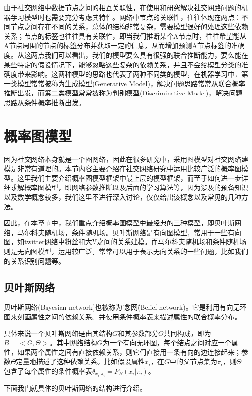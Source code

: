 由于社交网络中数据节点之间的相互关联性，在使用和研究解决社交网路问题的机器学习模型时也需要充分考虑其特性。网络中节点的关联性，往往体现在两点：不同节点之间存在不同的关系，总体的结构非常复杂，需要模型很好的处理这些依赖关系；节点的标签也往往具有关联性，即当我们推断某个A节点时，往往希望能从A节点周围的节点的标签分布并获取一定的信息，从而增加预测A节点标签的准确度。从这两点我们可以看出，我们的模型要么具有很强的联合推断能力，要么能在某些特定的假设情况下，能够忽略这些复杂的依赖关系，并且不会给模型分类的准确度带来影响。这两种模型的思路也代表了两种不同类的模型，在机器学习中，第一类模型常常被称为生成模型(Generative Model)，解决问题思路常常从联合概率推断出发，而第二类模型常常被称为判别模型(Discriminative Model)，解决问题思路从条件概率推断出发。

\section{概率图模型}

因为社交网络本身就是一个图网络，因此在很多研究中，采用图模型对社交网络建模是非常有道理的。本节内容主要介绍在社交网络研究中运用比较广泛的概率图模型。这里我们主要介绍概率图模型框架中最上层的模型框架，而至于如何进一步详细求解概率图模型，即网络参数推断以及后面的学习算法等，因为涉及的预备知识以及数学概念较多，我们这里不进行深入讨论，仅仅给出该概念以及常见的几种方法。

因此，在本章节中，我们重点介绍概率图模型中最经典的三种模型，即贝叶斯网络，马尔科夫随机场，条件随机场。贝叶斯网络是有向图模型，常用于一些有向图，如twitter网络中粉丝和大V之间的关系建模。而马尔科夫随机场和条件随机场则是无向图模型，运用较广泛，常常可以用于表示无向关系的一些问题，比如我们的关系识别问题等。


\subsection{贝叶斯网络}

贝叶斯网络(Bayesian network)也被称为\"信念网\"(Belief network)。它是利用有向无环图来刻画属性之间的依赖关系。并使用条件概率表来描述属性的联合概率分布。

具体来说一个贝叶斯网络是由其结构$G$和其参数部分$\Theta$共同构成，即为$B = <G,\Theta >$。其中网络结构$G$为一个有向无环图，每个结点之间对应一个属性，如果两个属性之间有直接依赖关系，则它们直接用一条有向的边连接起来；参数$\Theta$定量地描述了这种依赖关系。比如假设属性$x_i$，在$G$中的父节点集为$\pi_i$，则$\Theta$包含了每个属性的条件概率表$\theta_{x_i|\pi_i}= P_B(x_i|\pi_i)$。

下面我门就具体的贝叶斯网络的结构进行介绍。

